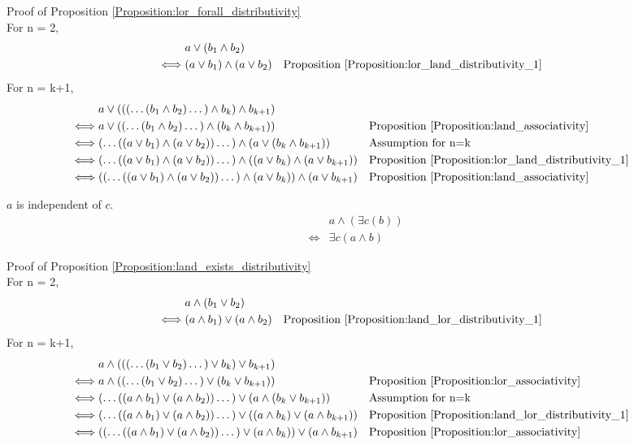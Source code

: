 Proof of Proposition \ref{Proposition:lor_forall_distributivity} \\
For n = 2,
\begin{align*}
& a \lor (b_1 \land b_2) \\
\iff & (a \lor b_1) \land (a \lor b_2)
& & \text{Proposition \ref{Proposition:lor_land_distributivity_1}} \\
\end{align*}
For n = k+1,
\begin{align*}
& a \lor ((( \dots (b_1 \land b_2) \dots ) \land b_k ) \land b_{k+1}) \\
\iff & a \lor (( \dots (b_1 \land b_2) \dots ) \land ( b_k \land b_{k+1}))
& & \text{Proposition \ref{Proposition:land_associativity}} \\
\iff & ( \dots ((a \lor b_1) \land (a \lor b_2)) \dots ) \land (a \lor (b_k \land b_{k+1}))
& & \text{Assumption for n=k} \\
\iff & ( \dots ((a \lor b_1) \land (a \lor b_2)) \dots ) \land ((a \lor b_k) \land (a \lor b_{k+1}))
& & \text{Proposition \ref{Proposition:lor_land_distributivity_1}} \\
\iff & (( \dots ((a \lor b_1) \land (a \lor b_2)) \dots ) \land (a \lor b_k)) \land (a \lor b_{k+1})
& & \text{Proposition \ref{Proposition:land_associativity}} \\
\end{align*}

\begin{prop}
\label{Proposition:land_exists_distributivity}
$a$ is independent of $c$.
\begin{align*}
& a \land (\exists c (b)) \\
\iff & \exists c (a \land b)
\end{align*}
\end{prop}

Proof of Proposition \ref{Proposition:land_exists_distributivity} \\
For n = 2,
\begin{align*}
& a \land (b_1 \lor b_2) \\
\iff & (a \land b_1) \lor (a \land b_2)
& & \text{Proposition \ref{Proposition:land_lor_distributivity_1}} \\
\end{align*}
For n = k+1,
\begin{align*}
& a \land ((( \dots (b_1 \lor b_2) \dots ) \lor b_k ) \lor b_{k+1}) \\
\iff & a \land (( \dots (b_1 \lor b_2) \dots ) \lor ( b_k \lor b_{k+1}))
& & \text{Proposition \ref{Proposition:lor_associativity}} \\
\iff & ( \dots ((a \land b_1) \lor (a \land b_2)) \dots ) \lor (a \land (b_k \lor b_{k+1}))
& & \text{Assumption for n=k} \\
\iff & ( \dots ((a \land b_1) \lor (a \land b_2)) \dots ) \lor ((a \land b_k) \lor (a \land b_{k+1}))
& & \text{Proposition \ref{Proposition:land_lor_distributivity_1}} \\
\iff & (( \dots ((a \land b_1) \lor (a \land b_2)) \dots ) \lor (a \land b_k)) \lor (a \land b_{k+1})
& & \text{Proposition \ref{Proposition:lor_associativity}} \\
\end{align*}

